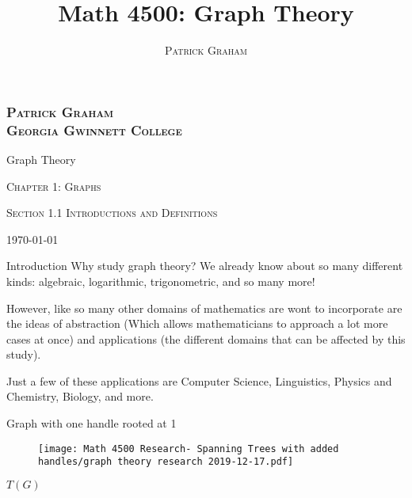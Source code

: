 \documentclass[xcolor=dvipsnames]{beamer}
\author{\textsc{Patrick Graham }}
\title{\textsc Math 4500: Graph Theory}
\numberwithin{equation}{section} \DeclareMathOperator{\Var}{Var}
\begin{document}
\begin{frame}[shrink=3]
  \frametitle{\textsc{\normalsize Patrick Graham \\ \hspace{6cm} Georgia Gwinnett College}}


\bigskip
\bigskip\bigskip\bigskip

{\centerline{\Huge\color{black} Graph Theory}}
\bigskip\bigskip
{\centerline{\Large \textsc{Chapter 1: Graphs}}}


\bigskip\bigskip\bigskip

{\centerline{\color{black} \textsc{Section 1.1 Introductions and Definitions}}}

\smallskip

{\centerline{\color{black}\textsc{\today}}}

\end{frame}


\begin{frame}{Introduction}
Why study graph theory? \pause We already know about so many different kinds:  \pause algebraic,  \pause logarithmic, \pause trigonometric,  \pause and so many more! 

\bigskip{}

However, like so many other domains of mathematics are wont to incorporate are the ideas of abstraction (Which allows mathematicians to approach a lot more cases at once) and applications (the different domains that can be affected by this study).

\bigskip{}

\pause Just a few of these applications are Computer Science, Linguistics, Physics and Chemistry, Biology, and more. 


\end{frame}


\begin{frame}{Graph with one handle rooted at 1}

\begin{figure}
    \centering
    \texttt{[image: Math 4500 Research- Spanning Trees with added handles/graph theory research 2019-12-17.pdf]}
 
\end{figure}
\(T(G)\) 

\end{frame}

\end{document}
